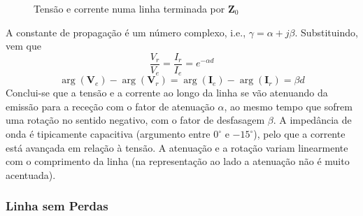 \noindent\begin{minipage}[c]{0.45\linewidth}
    \begin{figure}[H]
        \centering
        \caption{Tensão e corrente numa linha terminada por $\mathbf{Z}_0$}
    \end{figure}
\end{minipage}\hfill
\begin{minipage}[c]{0.5\linewidth}
    A constante de propagação é um número complexo, i.e., $\gamma = \alpha + j\beta$. Substituindo, vem que
    $$
        \frac{V_r}{V_e} = \frac{I_r}{I_e} = e^{-\alpha d}
    $$
    $$
        \arg(\mathbf{V}_e)-\arg(\mathbf{V}_r) = \arg(\mathbf{I}_e) - \arg(\mathbf{I}_r) = \beta d
    $$
    Conclui-se que a tensão e a corrente ao longo da linha se vão atenuando da emissão para a receção com o fator de atenuação $\alpha$, ao mesmo tempo que sofrem uma rotação no sentido negativo, com o fator de desfasagem $\beta$. A impedância de onda é tipicamente capacitiva (argumento entre $0^{\circ}$ e $-15^{\circ}$), pelo que a corrente está avançada em relação à tensão. A atenuação e a rotação variam linearmente com o comprimento da linha (na representação ao lado a atenuação não é muito acentuada).
\end{minipage}


\subsubsection{Linha sem Perdas}

